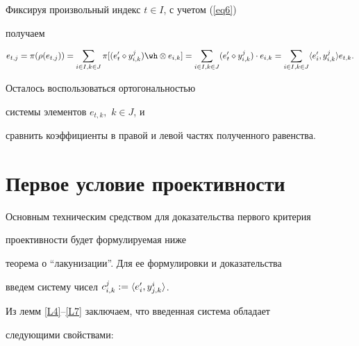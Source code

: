 \begin{pf}


Фиксируя произвольный индекс $t \in I$, с учетом (\ref{eq6})


получаем


$$


e_{t,j}=\pi (\rho (e_{t,j})) =\sumik \pi [(e'_t \dia y^j_{i,k})


\tens e_{i,k}]= \sumik (e'_t \dia y^j_{i,k}) \cd e_{i,k}=


\sumik \lan e'_i,y^j_{i,k} \ran e_{t,k}.


$$


Осталось воспользоваться ортогональностью 


системы элементов $e_{t,k},$ $k \in J$, и


сравнить коэффициенты в правой и левой частях полученного равенства.


\end{pf}





\section{Первое условие проективности}





Основным техническим средством для доказательства первого критерия


проективности будет формулируемая ниже 


теорема о ``лакунизации''. Для ее формулировки и доказательства


введем систему чисел $c^j_{i,k}:=\langle e'_i,y^i_{j,k}\rangle$.


Из лемм \ref{L4}--\ref{L7} заключаем, что введенная система обладает


следующими свойствами:


